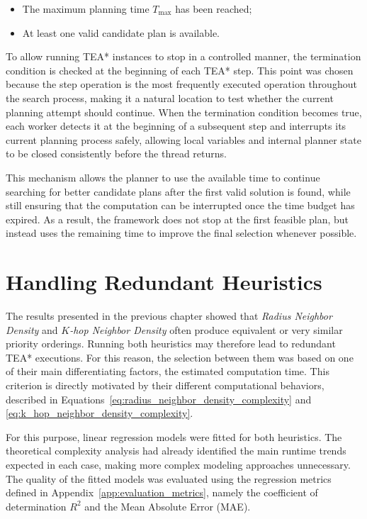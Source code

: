 \begin{itemize}
    \item The maximum planning time \(T_{\max}\) has been reached;
    \item At least one valid candidate plan is available.
\end{itemize}

To allow running TEA* instances to stop in a controlled manner, the termination condition is
checked at the beginning of each TEA* step. This point was chosen because the step operation is
the most frequently executed operation throughout the search process, making it a natural location
to test whether the current planning attempt should continue. When the termination condition
becomes true, each worker detects it at the beginning of a subsequent step and interrupts its
current planning process safely, allowing local variables and internal planner state to be closed
consistently before the thread returns.

This mechanism allows the planner to use the available time to continue searching for better
candidate plans after the first valid solution is found, while still ensuring that the computation can
be interrupted once the time budget has expired. As a result, the framework does not stop at the
first feasible plan, but instead uses the remaining time to improve the final selection whenever
possible.


\section{Handling Redundant Heuristics}
\label{sec:redundant_heuristics}
\hspace{\parindent}
The results presented in the previous chapter showed that \textit{Radius Neighbor Density} and
\textit{\(K\)-hop Neighbor Density} often produce equivalent or very similar priority orderings.
Running both heuristics may therefore lead to redundant TEA* executions. For this reason, the
selection between them was based on one of their main differentiating factors, the estimated
computation time. This criterion is directly motivated by their different computational behaviors,
described in Equations~\ref{eq:radius_neighbor_density_complexity} and
\ref{eq:k_hop_neighbor_density_complexity}.

For this purpose, linear regression models were fitted for both heuristics. The theoretical
complexity analysis had already identified the main runtime trends expected in each case, making
more complex modeling approaches unnecessary. The quality of the fitted models was evaluated using
the regression metrics defined in Appendix~\ref{app:evaluation_metrics}, namely the coefficient of
determination \(R^2\) and the Mean Absolute Error (MAE). 


